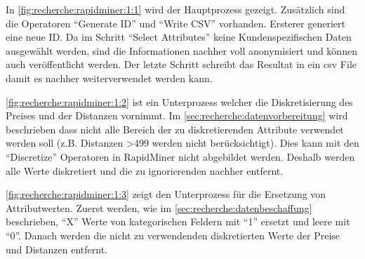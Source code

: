  In \ref{fig:recherche:rapidminer:1:1} wird der Hauptprozess gezeigt. Zusätzlich sind die Operatoren "`Generate ID"' und "`Write CSV"' vorhanden. Ersterer generiert eine neue ID. Da im Schritt "`Select Attributes"' keine Kundenspezifischen Daten ausgewählt werden, sind die Informationen nachher voll anonymisiert und können auch veröffentlicht werden. Der letzte Schritt schreibt das Resultat in ein \gls{csv} File damit es nachher weiterverwendet werden kann.

\cref{fig:recherche:rapidminer:1:2} ist ein Unterprozess welcher die Diskretisierung des Preises und der Distanzen vornimmt. Im \cref{sec:recherche:datenvorbereitung} wird beschrieben dass nicht alle Bereich der zu diskretierenden Attribute verwendet werden soll (z.B. Distanzen >499 werden nicht berücksichtigt). Dies kann mit den "`Discretize"' Operatoren in RapidMiner nicht abgebildet werden. Deshalb werden alle Werte diskretiert und die zu ignorierenden nachher entfernt.

\cref{fig:recherche:rapidminer:1:3} zeigt den Unterprozess für die Ersetzung von Attributwerten. Zuerst werden, wie im \cref{sec:recherche:datenbeschaffung} beschrieben, "`X"' Werte von kategorischen Feldern mit "`1"' ersetzt und leere mit "`0"'. Danach werden die nicht zu verwendenden diskretierten Werte der Preise und Distanzen entfernt.